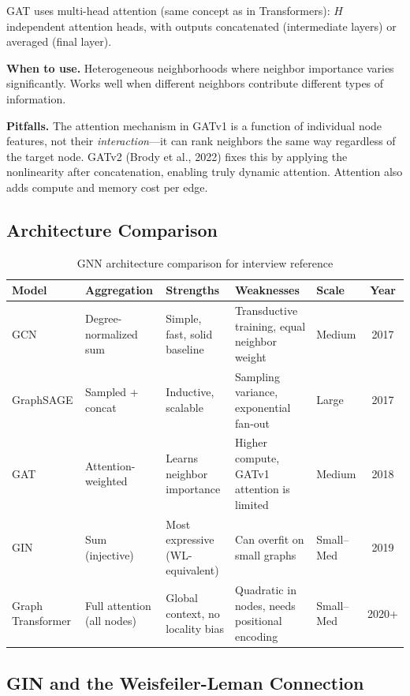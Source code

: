 GAT uses multi-head attention (same concept as in Transformers): $H$ independent attention heads, with outputs concatenated (intermediate layers) or averaged (final layer).

\textbf{When to use.} Heterogeneous neighborhoods where neighbor importance varies significantly. Works well when different neighbors contribute different types of information.

\textbf{Pitfalls.} The attention mechanism in GATv1 is a function of individual node features, not their \textit{interaction}---it can rank neighbors the same way regardless of the target node. GATv2 (Brody et al., 2022) fixes this by applying the nonlinearity after concatenation, enabling truly dynamic attention. Attention also adds compute and memory cost per edge.

\subsection{Architecture Comparison}

\begin{table}[H]
\centering
\caption{GNN architecture comparison for interview reference}
\begin{tabularx}{\textwidth}{lXXXXc}
\toprule
\textbf{Model} & \textbf{Aggregation} & \textbf{Strengths} & \textbf{Weaknesses} & \textbf{Scale} & \textbf{Year} \\
\midrule
GCN & Degree-normalized sum & Simple, fast, solid baseline & Transductive training, equal neighbor weight & Medium & 2017 \\
GraphSAGE & Sampled + concat & Inductive, scalable & Sampling variance, exponential fan-out & Large & 2017 \\
GAT & Attention-weighted & Learns neighbor importance & Higher compute, GATv1 attention is limited & Medium & 2018 \\
GIN & Sum (injective) & Most expressive (WL-equivalent) & Can overfit on small graphs & Small--Med & 2019 \\
Graph Transformer & Full attention (all nodes) & Global context, no locality bias & Quadratic in nodes, needs positional encoding & Small--Med & 2020+ \\
\bottomrule
\end{tabularx}
\end{table}

\subsection{GIN and the Weisfeiler-Leman Connection}

